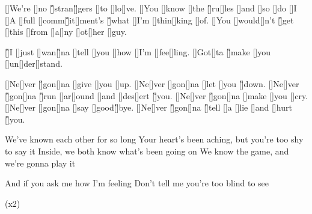 \begin{guitar}
	[\E]We're [\Fsharp]no [\G]stran[\G]gers [\A]to [\Fsharp]lo[\D]ve. [\E]You [\E]know [\Fsharp]the [\G]ru[\E]les [\D]and [\DD]so [\DD]do [\A]I
	[\E]A [\E]full [\Fsharp]comm[\G]it[\E]ment's [\G]what [\A]I'm [\Fsharp]thin[\E]king [\Fsharp]of. [\E]You [\E]would[\Fsharp]n't [\G]get [\E]this [\D]from [\A]a[\A]ny [\A]ot[\B]her [\A]guy.
	
	[\G]I [\A]just [\B]wan[\G]na [\A]tell [\A]you [\A]how [\B]I'm [\A]fee[\D]ling. [\E]Got[\Fsharp]ta [\G]make [\E]you [\A]un[\B]der[\A]stand.
	
	[\D]Ne[\E]ver [\G]gon[\E]na [\B]give [\B]you [\A]up. [\D]Ne[\E]ver [\Fsharp]gon[\D]na [\A]let [\A]you [\G]down.
	[\D]Ne[\E]ver [\G]gon[\E]na [\G]run [\A]ar[\Fsharp]ound [\D]and [\D]des[\A]ert [\G]you.
	[\D]Ne[\E]ver [\G]gon[\E]na [\B]make [\B]you [\A]cry. [\D]Ne[\E]ver [\Fsharp]gon[\D]na [\DD]say [\Fsharp]good[\G]bye.
	[\D]Ne[\E]ver [\G]gon[\E]na [\G]tell [\A]a [\Fsharp]lie [\D]and [\A]hurt [\G]you.
	
	We've known each other for so long
	Your heart's been aching, but you're too shy to say it
	Inside, we both know what's been going on
	We know the game, and we're gonna play it
	
	And if you ask me how I'm feeling
	Don't tell me you're too blind to see
	
	  (x2)
\end{guitar}
